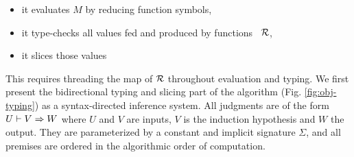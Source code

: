 \documentclass{llncs}
\begin{document}
\begin{itemize}
\item it evaluates $M$ by reducing function symbols,
\item it type-checks all values fed and produced by functions \wrt\ $\mathcal{R}$,
\item it slices those values
\end{itemize}

This requires threading the map of $\mathcal{R}$ throughout evaluation and
typing. We first present the bidirectional typing and slicing part of
the algorithm (Fig. \ref{fig:obj-typing}) as a syntax-directed
inference system. All judgments are of the form ${U}\vdash{{V}\Rightarrow{W}}$ where $U$
and $V$ are inputs, $V$ is the induction hypothesis and $W$ the
output. They are parameterized by a constant and implicit signature
$\Sigma$, and all premises are ordered in the algorithmic order of
computation.
\end{document}
